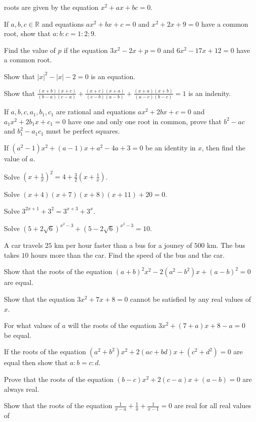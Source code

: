  roots are given by the equation $x^2 + ax + bc = 0$.
\item If $a, b, c\in\mathbb{R}$ and equations $ax^2 + bx + c = 0$ and $x^2 + 2x + 9 = 0$ have a common root, show that $a:b:c =
  1:2:9$.
\item Find the value of $p$ if the equation $3x^2 - 2x + p = 0$ and $6x^2 - 17x + 12 = 0$ have a common root.
\item Show that $|x|^2 - |x| - 2 = 0$ is an equation.
\item Show that $\frac{(x + b)(x + c)}{(b - a)(c - a)} + \frac{(x + c)(x + a)}{(c - b)(a - b)} + \frac{(x + a)(x + b)}{(a - c)(b -
  c)} = 1$ is an indenity.
\item If $a, b, c, a_1, b_1, c_1$ are rational and equations $ax^2 + 2bx + c = 0$ and $a_1x^2 + 2b_1x + c_1 = 0$ have one and only
  one root in common, prove that $b^2 - ac$ and $b_1^2 - a_1c_1$ must be perfect squares.
\item If $(a^2 - 1)x^2 + (a - 1)x + a^2 - 4a + 3 = 0$ be an identity in $x$, then find the value of $a$.
\item Solve $\left(x + \frac{1}{x}\right)^2 = 4 + \frac{3}{2}\left(x + \frac{1}{x}\right)$.
\item Solve $(x + 4)(x + 7)(x + 8)(x + 11) + 20 = 0$.
\item Solve $3^{2x + 1} + 3^2 = 3^{x + 3} + 3^x$.
\item Solve $(5 + 2\sqrt{6})^{x^2 - 3} + (5 - 2\sqrt{6})^{x^2 - 3} = 10$.
\item A car travels $25$ km per hour faster than a bus for a jouney of $500$ km. The bus takes $10$ hours more than the car. Find
  the speed of the bus and the car.
\item Show that the roots of the equation $(a + b)^2x^2 - 2(a^2 - b^2)x + (a - b)^2 = 0$ are equal.
\item Show that the equation $3x^2 + 7x + 8 = 0$ cannot be satisfied by any real values of $x$.
\item For what values of $a$ will the roots of the equation $3x^2 + (7 + a)x + 8 - a = 0$ be equal.
\item If the roots of the equation $(a^2 + b^2)x^2 + 2(ac + bd)x + (c^2 + d^2) = 0$ are equal then show that $a:b = c:d$.
\item Prove that the roots of the equation $(b - c)x^2 + 2(c - a)x + (a - b) = 0$ are always real.
\item Show that the roots of the equation $\frac{1}{x - a} + \frac{1}{a} + \frac{1}{x - 1} = 0$ are real for all real values of
